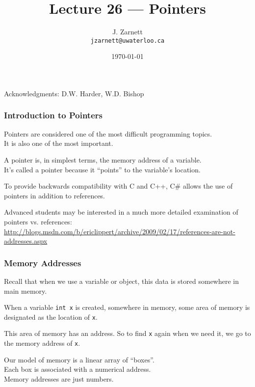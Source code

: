 

\title{Lecture 26  --- Pointers }

\author{J. Zarnett\\
\texttt{jzarnett@uwaterloo.ca}}
\date{\today}



\begin{frame}
  \titlepage
  
  \begin{center}
  \small{Acknowledgments: D.W. Harder, W.D. Bishop}
  \end{center}
\end{frame}


\begin{frame}
\frametitle{Introduction to Pointers}
\alert{Pointers} are considered one of the most difficult programming topics.\\
\quad It is also one of the most important.

A pointer is, in simplest terms, the memory address of a variable.\\
\quad It's called a pointer because it ``points'' to the variable's location.

To provide backwards compatibility with C and C++, C\# allows the use of pointers in addition to references.

Advanced students may be interested in a much more detailed examination of pointers vs. references:\\
\scriptsize{\url{http://blogs.msdn.com/b/ericlippert/archive/2009/02/17/references-are-not-addresses.aspx}}

\end{frame}

\begin{frame}
\frametitle{Memory Addresses}
Recall that when we use a variable or object, this data is stored somewhere in main memory.

When a variable \texttt{int x} is created, somewhere in memory, some area of memory is designated as the location of \texttt{x}.

This area of memory has an address. So to find \texttt{x} again when we need it, we go to the memory address of \texttt{x}.

Our model of memory is a linear array of ``boxes''.\\
\quad Each box is associated with a numerical address.\\
\quad Memory addresses are just numbers.



\end{frame}

